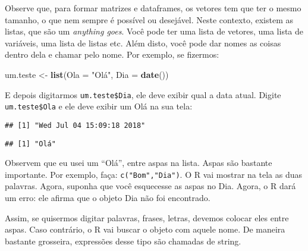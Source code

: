\documentclass[]{book}
\newenvironment{Shaded}{\begin{snugshade}}{\end{snugshade}}
\newcommand{\KeywordTok}[1]{\textcolor[rgb]{0.13,0.29,0.53}{\textbf{#1}}}
\newcommand{\DataTypeTok}[1]{\textcolor[rgb]{0.13,0.29,0.53}{#1}}
\newcommand{\StringTok}[1]{\textcolor[rgb]{0.31,0.60,0.02}{#1}}
\newcommand{\OperatorTok}[1]{\textcolor[rgb]{0.81,0.36,0.00}{\textbf{#1}}}
\newcommand{\NormalTok}[1]{#1}
\begin{document}
Observe que, para formar matrizes e dataframes, os vetores tem que ter o
mesmo tamanho, o que nem sempre é possível ou desejável. Neste contexto,
existem as listas, que são um \emph{anything goes}. Você pode ter uma
lista de vetores, uma lista de variáveis, uma lista de listas etc. Além
disto, você pode dar nomes as coisas dentro dela e chamar pelo nome. Por
exemplo, se fizermos:

\begin{Shaded}
\begin{Highlighting}[]
\NormalTok{um.teste <-}\StringTok{ }\KeywordTok{list}\NormalTok{(}\DataTypeTok{Ola =} \StringTok{"Olá"}\NormalTok{, }\DataTypeTok{Dia =} \KeywordTok{date}\NormalTok{())}
\end{Highlighting}
\end{Shaded}

E depois digitarmos \texttt{um.teste\$Dia}, ele deve exibir qual a data
atual. Digite \texttt{um.teste\$Ola} e ele deve exibir um Olá na sua
tela:

\begin{Shaded}
\end{Shaded}

\begin{verbatim}
## [1] "Wed Jul 04 15:09:18 2018"
\end{verbatim}

\begin{Shaded}
\end{Shaded}

\begin{verbatim}
## [1] "Olá"
\end{verbatim}

Observem que eu usei um ``Olá'', entre aspas na lista. Aspas são
bastante importante. Por exemplo, faça: \texttt{c("Bom","Dia")}. O R vai
mostrar na tela as duas palavras. Agora, suponha que você esquecesse as
aspas no Dia. Agora, o R dará um erro: ele afirma que o objeto Dia não
foi encontrado.

Assim, se quisermos digitar palavras, frases, letras, devemos colocar
eles entre aspas. Caso contrário, o R vai buscar o objeto com aquele
nome. De maneira bastante grosseira, expressões desse tipo são chamadas
de string.
\end{document}
